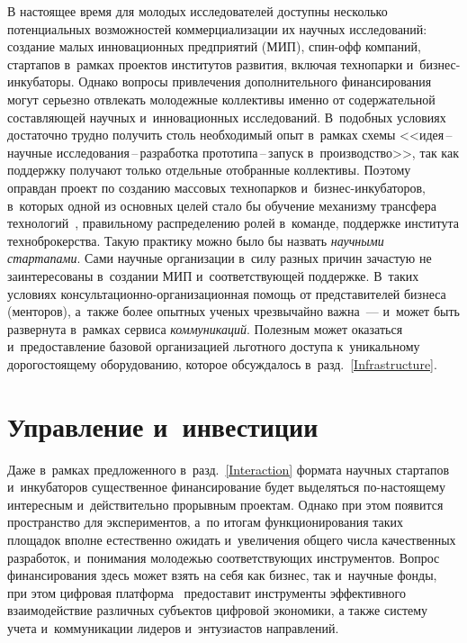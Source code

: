 \begin{multicols}{2}
В настоящее время для молодых исследователей доступны несколько 
потенциальных возможностей коммерциализации их научных исследований: создание 
малых инновационных предприятий (МИП), спин-офф компаний, стартапов в~рамках 
проектов институтов развития, включая технопарки и~биз\-нес-ин\-ку\-ба\-то\-ры. 
Однако вопросы привлечения дополнительного финансирования могут серь\-ез\-но отвлекать 
молодежные коллективы именно от содержательной составляющей научных и~инновационных 
исследований. В~подобных условиях достаточно трудно получить столь необходимый опыт 
в~рамках схемы <<идея\,--\,на\-уч\-ные ис\-сле\-до\-ва\-ния\,--\,раз\-ра\-бот\-ка 
про\-то\-ти\-па\,--\,за\-пуск в~производство>>, так как поддержку получают только 
отдельные отобранные коллективы. Поэтому оправдан проект по созданию массовых 
технопарков и~биз\-нес-ин\-ку\-ба\-то\-ров, в~которых одной из основных целей стало бы 
обучение механизму трансфера технологий~\cite{Grosse1996}, правильному 
распределению ролей в~команде, поддержке института техноброкерства. 
Такую практику можно было бы назвать \textit{научными стартапами}. Сами научные 
организации в~силу разных причин зачастую не заинтересованы в~создании 
МИП и~соответствующей поддержке. В~таких условиях кон\-суль\-та\-ци\-он\-но-ор\-га\-ни\-за\-ци\-он\-ная 
помощь от представителей бизнеса (менторов), а~также более опытных ученых чрезвычайно важна~--- 
и~может быть развернута в~рамках сервиса \textit{коммуникаций}. Полезным может 
оказаться и~предоставление базовой организацией льготного доступа к~уникальному 
дорогостоящему оборудованию, которое обсуждалось в~разд.~\ref{Infrastructure}.

\vspace*{-6pt}

\section{Управление и~инвестиции}

Даже в~рамках предложенного в~разд.~\ref{Interaction} формата научных 
стартапов и~инкубаторов существенное финансирование будет выделяться по-на\-сто\-яще\-му 
интересным и~действительно прорывным проектам. Однако при этом появится пространство 
для экспериментов, а~по итогам функционирования таких площадок вполне естественно 
ожидать и~увеличения общего числа качественных разработок, и~понимания молодежью 
соответствующих инструментов. Вопрос финансирования здесь может взять на себя как
 бизнес, так и~научные фонды, при этом цифровая платформа~\cite{Gorshenin2017} 
 предоставит инструменты эффективного взаимодействие различных субъектов цифровой 
 экономики, а также систему учета и~коммуникации лидеров и~энтузиастов направлений.
 {
 
}
\end{multicols}
